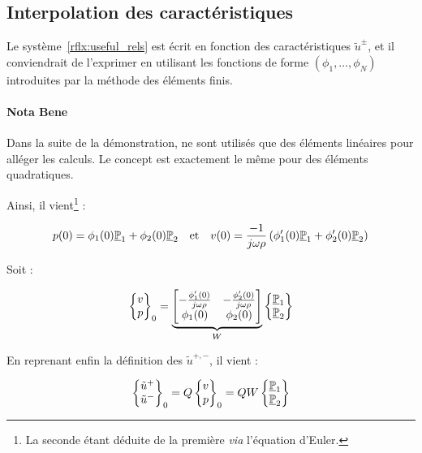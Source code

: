 \subsection{Interpolation des caractéristiques}

Le système~\eqref{rflx:useful_rels} est écrit en fonction des caractéristiques $\tilde{u}^\pm$, et il conviendrait de
l'exprimer en utilisant les fonctions de forme $(\phi_1, \ldots, \phi_N)$ introduites par la méthode des éléments finis.

\paragraph{Nota Bene} Dans la suite de la démonstration, ne sont utilisés que des éléments linéaires pour alléger les
calculs. Le concept est exactement le même pour des éléments quadratiques.

\medskip

Ainsi, il vient\footnote{La seconde étant déduite de la première \textit{via} l'équation d'Euler.} :

\begin{equation*}
	p(0) = \phi_1(0)\underline{\mathbb{P}}_1 + \phi_2(0)\underline{\mathbb{P}}_2 \quad\mathrm{et}\quad v(0) = \frac{-1}{j\omega\rho}\left(\phi'_1(0)\underline{\mathbb{P}}_1 +
		\phi'_2(0)\underline{\mathbb{P}}_2\right)
\end{equation*}

Soit :

\begin{equation*}
	\begin{Bmatrix}v\\p\end{Bmatrix}_0 = \underbrace{\begin{bmatrix}
		-\frac{\phi'_1(0)}{j\omega\rho} & -\frac{\phi'_2(0)}{j\omega\rho}\\
		\phi_1(0) & \phi_2(0)
\end{bmatrix}}_{W}
	\begin{Bmatrix}
		\underline{\mathbb{P}}_1\\\underline{\mathbb{P}}_2
	\end{Bmatrix}
\end{equation*}

En reprenant enfin la définition des $\tilde{u}^{+,-}$, il vient :

\begin{equation*}
\begin{Bmatrix}
	\tilde{u}^+\\\tilde{u}^-
\end{Bmatrix}_0 = Q\begin{Bmatrix}
	v\\p
\end{Bmatrix}_0 = QW\begin{Bmatrix}\underline{\mathbb{P}}_1\\\underline{\mathbb{P}}_2\end{Bmatrix}
\end{equation*}

